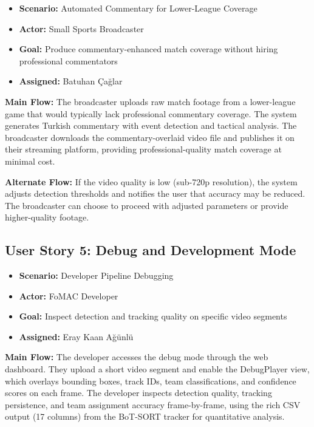 \documentclass[10pt,twocolumn,a4paper]{article}
\begin{document}
\begin{itemize}[noitemsep,topsep=0pt]
  \item \textbf{Scenario:} Automated Commentary for Lower-League Coverage
  \item \textbf{Actor:} Small Sports Broadcaster
  \item \textbf{Goal:} Produce commentary-enhanced match coverage without hiring professional commentators
  \item \textbf{Assigned:} Batuhan \c{C}a\u{g}lar
\end{itemize}

\textbf{Main Flow:} The broadcaster uploads raw match footage from a lower-league game that would typically lack professional commentary coverage. The system generates Turkish commentary with event detection and tactical analysis. The broadcaster downloads the commentary-overlaid video file and publishes it on their streaming platform, providing professional-quality match coverage at minimal cost.

\textbf{Alternate Flow:} If the video quality is low (sub-720p resolution), the system adjusts detection thresholds and notifies the user that accuracy may be reduced. The broadcaster can choose to proceed with adjusted parameters or provide higher-quality footage.

\subsection{User Story 5: Debug and Development Mode}

\begin{itemize}[noitemsep,topsep=0pt]
  \item \textbf{Scenario:} Developer Pipeline Debugging
  \item \textbf{Actor:} FoMAC Developer
  \item \textbf{Goal:} Inspect detection and tracking quality on specific video segments
  \item \textbf{Assigned:} Eray Kaan A\u{g}\"unl\"u
\end{itemize}

\textbf{Main Flow:} The developer accesses the debug mode through the web dashboard. They upload a short video segment and enable the DebugPlayer view, which overlays bounding boxes, track IDs, team classifications, and confidence scores on each frame. The developer inspects detection quality, tracking persistence, and team assignment accuracy frame-by-frame, using the rich CSV output (17 columns) from the BoT-SORT tracker for quantitative analysis.
\end{document}
